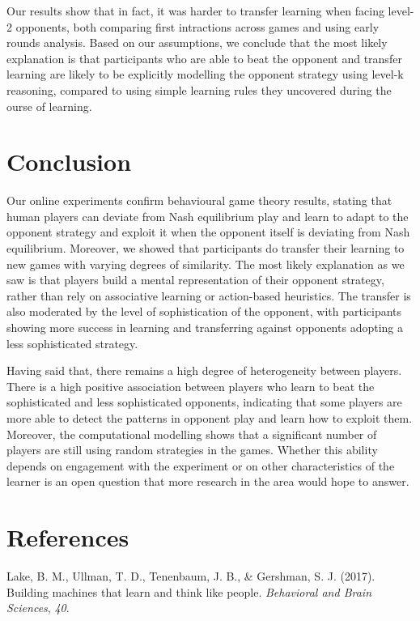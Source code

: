 \documentclass[man,floatsintext]{apa6}
\begin{document}
Our results show that in fact, it was harder to transfer learning when facing level-2 opponents, both comparing first intractions across games and using early rounds analysis. Based on our assumptions, we conclude that the most likely explanation is that participants who are able to beat the opponent and transfer learning are likely to be explicitly modelling the opponent strategy using level-k reasoning, compared to using simple learning rules they uncovered during the ourse of learning.

\newpage

\hypertarget{conclusion}{%
\section{Conclusion}\label{conclusion}}

Our online experiments confirm behavioural game theory results, stating that human players can deviate from Nash equilibrium play and learn to adapt to the opponent strategy and exploit it when the opponent itself is deviating from Nash equilibrium. Moreover, we showed that participants do transfer their learning to new games with varying degrees of similarity. The most likely explanation as we saw is that players build a mental representation of their opponent strategy, rather than rely on associative learning or action-based heuristics. The transfer is also moderated by the level of sophistication of the opponent, with participants showing more success in learning and transferring against opponents adopting a less sophisticated strategy.

Having said that, there remains a high degree of heterogeneity between players. There is a high positive association between players who learn to beat the sophisticated and less sophisticated opponents, indicating that some players are more able to detect the patterns in opponent play and learn how to exploit them. Moreover, the computational modelling shows that a significant number of players are still using random strategies in the games. Whether this ability depends on engagement with the experiment or on other characteristics of the learner is an open question that more research in the area would hope to answer.

\newpage

\hypertarget{references}{%
\section{References}\label{references}}

\begingroup
\setlength{\parindent}{-0.5in}
\setlength{\leftskip}{0.5in}

\hypertarget{refs}{}
\leavevmode\hypertarget{ref-lake2017building}{}%
Lake, B. M., Ullman, T. D., Tenenbaum, J. B., \& Gershman, S. J. (2017). Building machines that learn and think like people. \emph{Behavioral and Brain Sciences}, \emph{40}.

\endgroup
\end{document}
